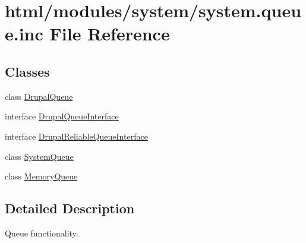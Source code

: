 \hypertarget{system_8queue_8inc}{
\section{html/modules/system/system.queue.inc File Reference}
\label{system_8queue_8inc}
}
\subsection*{Classes}
\begin{DoxyCompactItemize}
\item 
class \hyperlink{classDrupalQueue}{DrupalQueue}
\item 
interface \hyperlink{interfaceDrupalQueueInterface}{DrupalQueueInterface}
\item 
interface \hyperlink{interfaceDrupalReliableQueueInterface}{DrupalReliableQueueInterface}
\item 
class \hyperlink{classSystemQueue}{SystemQueue}
\item 
class \hyperlink{classMemoryQueue}{MemoryQueue}
\end{DoxyCompactItemize}


\subsection{Detailed Description}
Queue functionality. 